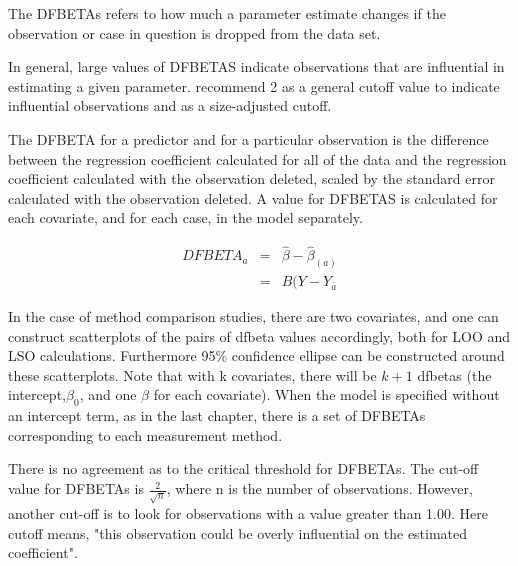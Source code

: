 \documentclass[12pt, a4paper]{report}
\theoremstyle{plain}
\theoremstyle{definition}
\theoremstyle{remark}
\begin{document}
	
	The DFBETAs refers to how much a parameter estimate changes if the observation or case in question is dropped from the data set.

	In general, large values of DFBETAS indicate observations that are influential in estimating a given parameter. \citet{belsley2005} recommend 2 as a general cutoff value to indicate influential observations and  as a size-adjusted cutoff.
	
	
	The DFBETA for a predictor and for a particular observation is the difference between the regression coefficient calculated for all of the data and the regression coefficient calculated with the observation deleted, scaled by the standard error calculated with the observation deleted.
	A value for DFBETAS is calculated for each covariate, and for each case, in the model separately.
	
	
	
	\begin{eqnarray}
	DFBETA_{a} &=& \hat{\beta} - \hat{\beta}_{(a)} \\
	&=& B(Y-Y_{\bar{a}}
	\end{eqnarray}
	
	In the case of method comparison studies, there are two covariates, and one can construct scatterplots of the pairs of dfbeta values accordingly, both for LOO and LSO calculations. Furthermore 95\% confidence ellipse can be constructed around these scatterplots.
	Note that with k covariates, there will be $k+1$ dfbetas (the intercept,$\beta_0$, and one $\beta$ for each covariate). When the model is specified without an intercept term, as in the last chapter, there is a set of DFBETAs corresponding to each measurement method.
	
	
	
	
	There is no agreement as to the critical threshold for DFBETAs. The cut-off value for DFBETAs is $\frac{2}{\sqrt{n}}$, where n is the number of observations.
	However, another cut-off is to look for observations with a value greater than 1.00. Here cutoff means,
	"this observation could be overly influential on the estimated coefficient".
	
\end{document}
